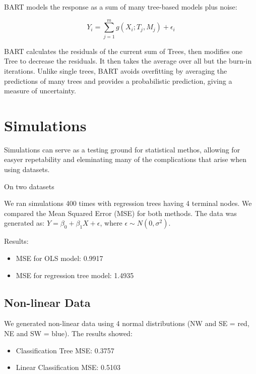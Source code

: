 \documentclass[12pt]{article}
\begin{document}
BART models the response as a sum of many tree-based models plus noise:

\begin{equation}
    Y_i = \sum_{j=1}^{m} g(X_i; T_j, M_j) + \epsilon_i
\end{equation}

BART calculates the residuals of the current sum of Trees, then modifies one Tree to decrease the residuals. It then takes the average over all but the burn-in iterations. Unlike single trees, BART avoids overfitting by averaging the predictions of many trees and provides a probabilistic prediction, giving a measure of uncertainty.








\section{Simulations}

Simulations can serve as a testing ground for statistical methos, allowing for easyer repetability and eleminating many of the complications that arise when using datasets.

On two datasets 

We ran simulations 400 times with regression trees having 4 terminal nodes. We compared the Mean Squared Error (MSE) for both methods. The data was generated as: $Y = \beta_0 + \beta_1X + \epsilon$, where $\epsilon \sim N(0, \sigma^2)$.

Results:
\begin{itemize}
    \item MSE for OLS model: 0.9917 
    \item MSE for regression tree model: 1.4935 
\end{itemize}


\subsection{Non-linear Data}
We generated non-linear data using 4 normal distributions (NW and SE = red, NE and SW = blue). The results showed:

\begin{itemize}
    \item Classification Tree MSE: 0.3757
    \item Linear Classification MSE: 0.5103
\end{itemize}
\end{document}
